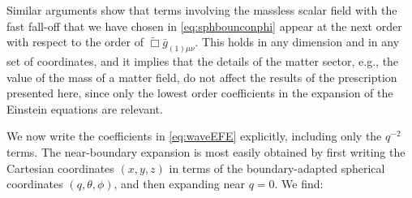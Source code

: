 \documentclass[a4paper,11pt]{article}
\numberwithin{equation}{section}
\begin{document}
Similar arguments show that terms involving the massless scalar field with the fast fall-off that we have chosen in \eqref{eq:sphbounconphi} appear at the next order with respect to the order of $\tilde{\Box}\bar{g}_{(1)\mu\nu}$. This holds in any dimension and in any set of coordinates, and it implies that the details of the matter sector, e.g., the value of the mass of a matter field, do not affect the results of the prescription presented here, since only the lowest order coefficients in the expansion of the Einstein equations are relevant.

We now write the coefficients in \eqref{eq:waveEFE} explicitly, including only the $q^{-2}$ terms.
The near-boundary expansion is most easily obtained by first writing the Cartesian coordinates $(x,y,z)$ in terms of the boundary-adapted spherical coordinates $(q,\theta,\phi)$, and then expanding near $q=0$. We find:
\end{document}
